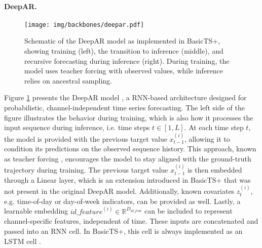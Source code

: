 \documentclass[a4paper,oneside,bibliography=totoc]{scrbook}
\begin{document}

\paragraph{DeepAR.}
\begin{figure}
\centering
\texttt{[image: img/backbones/deepar.pdf]}
\caption{Schematic of the DeepAR model as implemented in BasicTS+, showing training (left), the transition to inference (middle), and recursive forecasting during inference (right). During training, the model uses teacher forcing with observed values, while inference relies on ancestral sampling.}
\label{fig:DeepAR}
\end{figure}
Figure \ref{fig:DeepAR} presents the DeepAR model \cite{salinas_deepar_2020}, a RNN-based architecture designed for probabilistic, channel-independent time series forecasting. The left side of the figure illustrates the behavior during training, which is also how it processes the input sequence during inference, i.e. time steps $t \in [1, L]$.
At each time step $t$, the model is provided with the previous target value ${x_{t-1}^{(i)}}$, allowing it to condition its predictions on the observed sequence history. This approach, known as teacher forcing \cite{williams_learning_1989}, encourages the model to stay aligned with the ground-truth trajectory during training.
The previous target value ${x_{t-1}^{(i)}}$ is then embedded through a Linear layer, which is an extension introduced in BasicTS+ that was not present in the original DeepAR model.
Additionally, known covariates ${z_{t}^{(i)}}$, e.g. time-of-day or day-of-week indicators, can be provided as well. 
Lastly, a learnable embedding $\textit{id\_feature}^{(i)} \in \mathbb{R}^{D_{id\_feat}}$ can be included to represent channel-specific features, independent of time.
These inputs are concatenated and passed into an RNN cell. In BasicTS+, this cell is always implemented as an LSTM cell \cite{hochreiter_long_1997}. 
\end{document}
